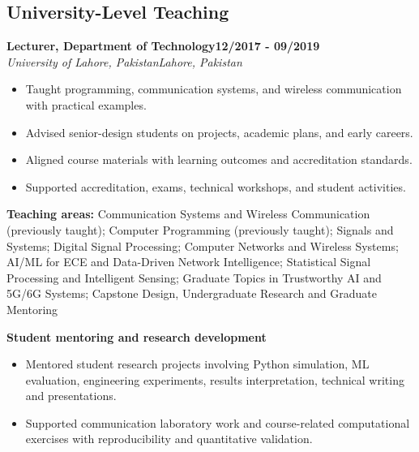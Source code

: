\documentclass[8pt,letterpaper]{extarticle}
\newcommand{\role}[4]{%
  \Needspace{4\baselineskip}\textbf{#1}\hfill\textbf{#2}\\[-1pt]
  \textit{#3}\hfill\textit{#4}\par}
\begin{document}
\subsection{University-Level Teaching}
\role{Lecturer, Department of Technology}{12/2017 - 09/2019}{University of Lahore, Pakistan}{Lahore, Pakistan}
\begin{itemize}
\item Taught programming, communication systems, and wireless communication with practical examples.
\item Advised senior-design students on projects, academic plans, and early careers.
\item Aligned course materials with learning outcomes and accreditation standards.
\item Supported accreditation, exams, technical workshops, and student activities.
\end{itemize}
\vspace{1pt}
{\small\textbf{Teaching areas:} Communication Systems and Wireless Communication (previously taught); Computer Programming (previously taught); Signals and Systems; Digital Signal Processing; Computer Networks and Wireless Systems; AI/ML for ECE and Data-Driven Network Intelligence; Statistical Signal Processing and Intelligent Sensing; Graduate Topics in Trustworthy AI and 5G/6G Systems; Capstone Design, Undergraduate Research and Graduate Mentoring}\par
{}\noindent\textbf{Student mentoring and research development}\par
\begin{itemize}
\item Mentored student research projects involving Python simulation, ML evaluation, engineering experiments, results interpretation, technical writing and presentations.
\item Supported communication laboratory work and course-related computational exercises with reproducibility and quantitative validation.
\end{itemize}
\end{document}
